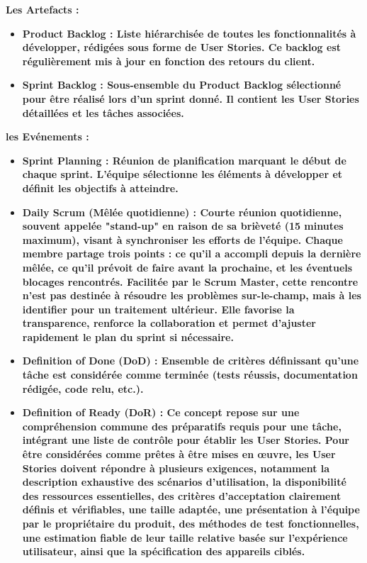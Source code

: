 {\begin{itemize}
\end{itemize}

\noindent \bfseries Les Artefacts \mdseries : 
\begin{itemize}
\item \noindent \bfseries Product Backlog  \mdseries :  Liste hiérarchisée de toutes les fonctionnalités à développer, rédigées sous forme de User Stories. Ce backlog est régulièrement mis à jour en fonction des retours du client.

\item \noindent \bfseries Sprint Backlog  \mdseries : Sous-ensemble du Product Backlog sélectionné pour être réalisé lors d’un sprint donné. Il contient les User Stories détaillées et les tâches associées.
\end{itemize}
\newpage
\noindent \bfseries les Evénements \mdseries : 
\begin{itemize}
\item \noindent \bfseries Sprint Planning  \mdseries : Réunion de planification marquant le début de chaque sprint. L’équipe sélectionne les éléments à développer et définit les objectifs à atteindre.
\item \noindent \bfseries Daily Scrum (Mêlée quotidienne)  \mdseries : Courte réunion quotidienne, souvent appelée "stand-up" en raison de sa brièveté (15 minutes maximum), visant à synchroniser les efforts de l’équipe. Chaque membre partage trois points : ce qu’il a accompli depuis la dernière mêlée, ce qu’il prévoit de faire avant la prochaine, et les éventuels blocages rencontrés. Facilitée par le Scrum Master, cette rencontre n’est pas destinée à résoudre les problèmes sur-le-champ, mais à les identifier pour un traitement ultérieur. Elle favorise la transparence, renforce la collaboration et permet d’ajuster rapidement le plan du sprint si nécessaire.
\item \noindent \bfseries Definition of Done (DoD) \mdseries :
Ensemble de critères définissant qu’une tâche est considérée comme terminée (tests réussis, documentation rédigée, code relu, etc.).
\item \noindent \bfseries Definition of Ready (DoR) \mdseries :
Ce concept repose sur une compréhension commune des préparatifs requis pour une tâche, intégrant une liste de contrôle pour établir les User Stories. Pour être considérées comme prêtes à être mises en œuvre, les User Stories doivent répondre à plusieurs exigences, notamment la description exhaustive des scénarios d'utilisation, la disponibilité des ressources essentielles, des critères d'acceptation clairement définis et vérifiables, une taille adaptée, une présentation à l'équipe par le propriétaire du produit, des méthodes de test fonctionnelles, une estimation fiable de leur taille relative basée sur l'expérience utilisateur, ainsi que la spécification des appareils ciblés.


\end{itemize}}
